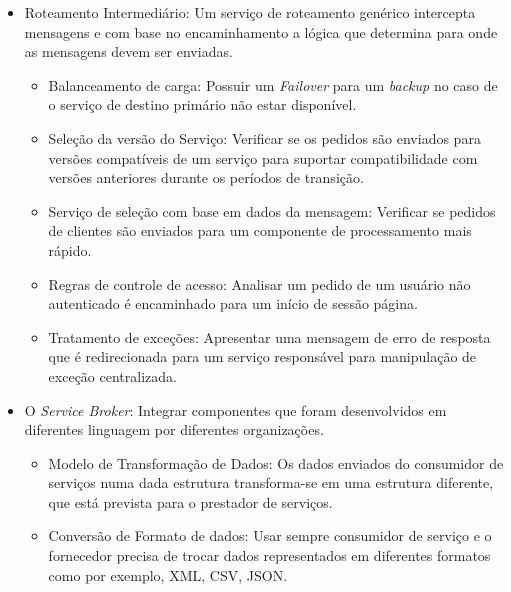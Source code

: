 \begin{itemize}

\item Roteamento Intermediário: Um serviço de roteamento genérico intercepta mensagens e com base no encaminhamento a lógica que determina para onde as mensagens devem ser enviadas.

\begin{itemize}

\item Balanceamento de carga: Possuir um \textit{Failover} para um \textit{backup} no caso de o serviço de destino 	primário não estar disponível.

\item{Seleção da versão do Serviço: Verificar se os pedidos são enviados para versões compatíveis de um serviço para     suportar compatibilidade com versões anteriores durante os períodos de transição}.

\item Serviço de seleção com base em dados da mensagem: Verificar se pedidos de clientes são enviados para um componente de processamento mais rápido.

\item Regras de controle de acesso: Analisar um pedido de um usuário não autenticado é encaminhado para um início de sessão página.

\item Tratamento de exceções: Apresentar uma mensagem de erro de resposta que é redirecionada para um serviço responsável para manipulação de exceção centralizada.

\end{itemize}

\item O \textit{Service Broker}: Integrar componentes que foram desenvolvidos em diferentes linguagem por diferentes organizações.

\begin{itemize}

\item Modelo de Transformação de Dados: Os dados enviados do consumidor de serviços numa dada estrutura transforma-se em uma estrutura diferente, que está prevista para o prestador de serviços.

\item Conversão de Formato de dados: Usar sempre consumidor de serviço e o fornecedor precisa de trocar dados representados em diferentes formatos como por exemplo, \acrshort{XML}, \acrshort{CSV}, \acrshort{JSON}.


\end{itemize}
\end{itemize}
